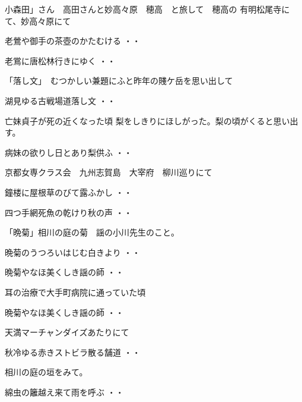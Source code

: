 \vspace{0.6cm}
小森田」さん　高田さんと妙高々原　穂高　と旅して　穂高の
有明松尾寺にて、妙高々原にて
\begin{shiika}老鶯や御手の茶壺のかたむける
\hfill{・・}\end{shiika}
\begin{shiika}老鴬に唐松林行きにゆく
\hfill{・・}\end{shiika}
「落し文」　むつかしい兼題にふと昨年の賤ケ岳を思い出して
\begin{shiika}湖見ゆる古戦場道落し文
\hfill{・・}\end{shiika}
\vspace{0.6cm}
亡妹貞子が死の近くなった頃
梨をしきりにほしがった。梨の頃がくると思い出す。
\begin{shiika}病妹の欲りし日とあり梨供ふ
\hfill{・・}\end{shiika}
\vspace{0.6cm}
京都女専クラス会　九州志賀島　大宰府　柳川巡りにて
\begin{shiika}鐘楼に屋根草のびて露ふかし
\hfill{・・}\end{shiika}
\begin{shiika}四つ手網死魚の乾けり秋の声
\hfill{・・}\end{shiika}
\vspace{0.6cm}
「晩菊」相川の庭の菊　謡の小川先生のこと。
\begin{shiika}晩菊のうつろいはじむ白きより
\hfill{・・}\end{shiika}
\begin{shiika}晩菊やなほ美くしき謡の師
\hfill{・・}\end{shiika}
\vspace{0.6cm}
耳の治療で大手町病院に通っていた頃
\begin{shiika}晩菊やなほ美くしき謡の師
\hfill{・・}\end{shiika}
\vspace{0.6cm}
天満マーチャンダイズあたりにて
\begin{shiika}秋冷ゆる赤きストビラ散る舗道
\hfill{・・}\end{shiika}
\vspace{0.6cm}
相川の庭の垣をみて。
\begin{shiika}綿虫の籬越え来て雨を呼ぶ
\hfill{・・}\end{shiika}
\vspace{0.6cm}
